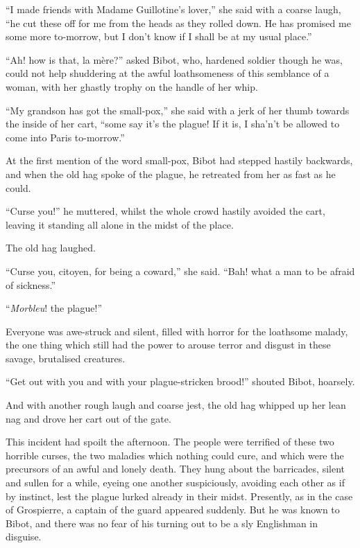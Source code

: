 \documentclass[paper=5.5in:8.5in,BCOR=7mm,twoside,DIV=calc,12pt,usegeometry,chapterprefix,endperiod,headings=big]{scrbook}
\begin{document}
\enquote{I made friends with Madame Guillotine's lover,} she said with a coarse laugh, \enquote{he cut these off for me from the heads as they rolled down. He has promised me some more to-morrow, but I don't know if I shall be at my usual place.}

\enquote{Ah! how is that, la mère?} asked Bibot, who, hardened soldier though he was, could not help shuddering at the awful loathsomeness of this semblance of a woman, with her ghastly trophy on the handle of her whip.

\enquote{My grandson has got the small-pox,} she said with a jerk of her thumb towards the inside of her cart, \enquote{some say it's the plague! If it is, I sha'n’t be allowed to come into Paris to-morrow.}

At the first mention of the word small-pox, Bibot had stepped hastily backwards, and when the old hag spoke of the plague, he retreated from her as fast as he could.

\enquote{Curse you!} he muttered, whilst the whole crowd hastily avoided the cart, leaving it standing all alone in the midst of the place.

The old hag laughed.

\enquote{Curse you, citoyen, for being a coward,} she said. \enquote{Bah! what a man to be afraid of sickness.}

\enquote{\textit{Morbleu}! the plague!}

Everyone was awe-struck and silent, filled with horror for the loathsome malady, the one thing which still had the power to arouse terror and disgust in these savage, brutalised creatures.

\enquote{Get out with you and with your plague-stricken brood!} shouted Bibot, hoarsely.

And with another rough laugh and coarse jest, the old hag whipped up her lean nag and drove her cart out of the gate.

This incident had spoilt the afternoon. The people were terrified of these two horrible curses, the two maladies which nothing could cure, and which were the precursors of an awful and lonely death. They hung about the barricades, silent and sullen for a while, eyeing one another suspiciously, avoiding each other as if by instinct, lest the plague lurked already in their midst. Presently, as in the case of Grospierre, a captain of the guard appeared suddenly. But he was known to Bibot, and there was no fear of his turning out to be a sly Englishman in disguise.
\end{document}
